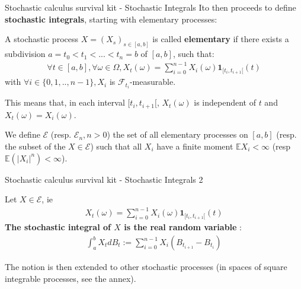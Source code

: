 \begin{frame}{Stochastic calculus survival kit - Stochastic Integrals}
    Ito then proceeds to define \textbf{stochastic integrals}, starting with elementary processes:

\begin{definition}
A stochastic process $X = (X_s)_{s \in [a,b]}$ is called \textbf{elementary} if there exists a subdivision $a = t_0 < t_1 < ... < t_n = b$ of $[a,b]$, such that:
\begin{align*}
    \forall t \in [a,b], \forall \omega \in \Omega, X_t(\omega) = \sum_{i=0}^{n-1} X_i(\omega) \textbf{1}_{[t_i, t_{i+1}[}(t)
\end{align*}
with $\forall i \in \{0,1,..,n-1\}, X_i$ is $\mathcal{F}_{t_i}$-measurable.

This means that, in each interval $[t_i, t_{i+1}[$, $X_t(\omega)$ is independent of $t$ and $X_t(\omega) = X_i(\omega)$.

We define $\mathcal{E}$ (resp. $\mathcal{E}_n, n>0$) the set of all elementary processes on $[a,b]$ (resp. the subset of the $X \in \mathcal{E}$) such that all $X_i$ have a finite moment $\mathbb{E}X_i <\infty$ (resp $\mathbb{E}(\vert X_i\vert^n) < \infty$).
\end{definition}
\end{frame}

\begin{frame}{Stochastic calculus survival kit - Stochastic Integrals 2}
\begin{definition}
Let $X \in \mathcal{E}$, ie
\begin{align*}
X_t(\omega) = \sum_{i=0}^{n-1} X_i(\omega) \textbf{1}_{[t_i, t_{i+1}[}(t)
\end{align*}
\textbf{The stochastic integral of $X$ is the real random variable} :
\begin{align*}
\int_a^b X_t dB_t := \sum_{i=0}^{n-1} X_i (B_{t_{i+1}} - B_{t_{i}})
\end{align*}
\end{definition}

The notion is then extended to other stochastic processes (in spaces of square integrable processes, see the annex).
\end{frame}


